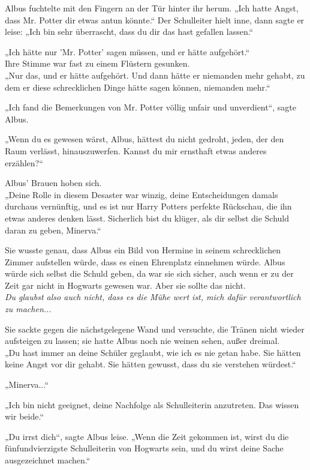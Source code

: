 {Albus fuchtelte mit den Fingern an der Tür hinter ihr herum. „Ich hatte Angst, dass Mr. Potter dir etwas antun könnte.“ Der Schulleiter hielt inne, dann sagte er leise: „Ich bin sehr überrascht, dass du dir das hast gefallen lassen.“

„Ich hätte nur 'Mr. Potter' sagen müssen, und er hätte aufgehört.“\\ Ihre Stimme war fast zu einem Flüstern gesunken.\\ „Nur das, und er hätte aufgehört. Und dann hätte er niemanden mehr gehabt, zu dem er diese schrecklichen Dinge hätte sagen können, niemanden mehr.“

„Ich fand die Bemerkungen von Mr. Potter völlig unfair und unverdient“, sagte Albus.

„Wenn du es gewesen wärst, Albus, hättest du nicht gedroht, jeden, der den Raum verlässt, hinauszuwerfen. Kannst du mir ernsthaft etwas anderes erzählen?“

Albus' Brauen hoben sich.\\ „Deine Rolle in diesem Desaster war winzig, deine Entscheidungen damals durchaus vernünftig, und es ist nur Harry Potters perfekte Rückschau, die ihn etwas anderes denken lässt. Sicherlich bist du klüger, als dir selbst die Schuld daran zu geben, Minerva.“

Sie wusste genau, dass Albus ein Bild von Hermine in seinem schrecklichen Zimmer aufstellen würde, dass es einen Ehrenplatz einnehmen würde. Albus würde sich selbst die Schuld geben, da war sie sich sicher, auch wenn er zu der Zeit gar nicht in Hogwarts gewesen war. Aber sie sollte das nicht.\\ \emph{Du glaubst also auch nicht, dass es die Mühe wert ist, mich dafür verantwortlich zu machen...}

Sie sackte gegen die nächstgelegene Wand und versuchte, die Tränen nicht wieder aufsteigen zu lassen; sie hatte Albus noch nie weinen sehen, außer dreimal.\\ „Du hast immer an deine Schüler geglaubt, wie ich es nie getan habe. Sie hätten keine Angst vor dir gehabt. Sie hätten gewusst, dass du sie verstehen würdest.“

„Minerva...“

„Ich bin nicht geeignet, deine Nachfolge als Schulleiterin anzutreten. Das wissen wir beide.“

„Du irrst dich“, sagte Albus leise. „Wenn die Zeit gekommen ist, wirst du die fünfundvierzigste Schulleiterin von Hogwarts sein, und du wirst deine Sache ausgezeichnet machen.“

}
